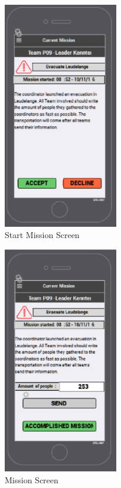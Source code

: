 \begin{figure}[htbp]
\begin{center}
 \caption{\label{fig:A13} Start Mission Screen}
   \includegraphics[width=50mm]{./images/App/startmission.eps}
\end{center}
\end{figure}
\begin{figure}[htbp]
\begin{center}
 \caption{\label{fig:A14} Mission Screen}
   \includegraphics[width=50mm]{./images/App/missionscreen.eps}
\end{center}
\end{figure}
